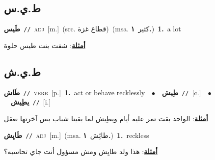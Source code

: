 \documentclass[10pt,a4paper,twoside]{article} %
\begin{document}
\begin{multicols}{2}
\vspace{-3mm}
\subsection*{\color{blue}\foreignlanguage{arabic}{ط.ي.س}\color{blue}{}} 

{\setlength\topsep{0pt}\textbf{\foreignlanguage{arabic}{طَيس}}\ {\color{gray}\texttt{//}\color{black}}\ \textsc{adj}\ [m.]\ (src. \color{gray}\foreignlanguage{arabic}{قطاع غزة}\color{black})\ \color{gray}(msa. \foreignlanguage{arabic}{كثير}~\foreignlanguage{arabic}{\textbf{١.}})\color{black}\ \textbf{1.}~a lot\  \begin{flushright}\color{gray}\foreignlanguage{arabic}{\textbf{\underline{\foreignlanguage{arabic}{أمثلة}}}: شفت بنت طيس حلوة}\end{flushright}\color{black}} \vspace{2mm}

\vspace{-3mm}
\subsection*{\color{blue}\foreignlanguage{arabic}{ط.ي.ش}\color{blue}{}} 

{\setlength\topsep{0pt}\textbf{\foreignlanguage{arabic}{طَاش}}\ {\color{gray}\texttt{//}\color{black}}\ \textsc{verb}\ [p.]\ \textbf{1.}~act or behave recklessly\ \ $\bullet$\ \ \setlength\topsep{0pt}\textbf{\foreignlanguage{arabic}{طِيش}}\ {\color{gray}\texttt{//}\color{black}}\ [c.]\ \ $\bullet$\ \ \setlength\topsep{0pt}\textbf{\foreignlanguage{arabic}{يطِيش}}\ {\color{gray}\texttt{//}\color{black}}\ [i.]\  \begin{flushright}\color{gray}\foreignlanguage{arabic}{\textbf{\underline{\foreignlanguage{arabic}{أمثلة}}}: الواحد بقت تمر عليه أيام ويطِيش لما بقينا شباب بس آخرتها نعقل}\end{flushright}\color{black}} \vspace{2mm}

{\setlength\topsep{0pt}\textbf{\foreignlanguage{arabic}{طَايِش}}\ {\color{gray}\texttt{//}\color{black}}\ \textsc{adj}\ [m.]\ \color{gray}(msa. \foreignlanguage{arabic}{طائِش}~\foreignlanguage{arabic}{\textbf{١.}})\color{black}\ \textbf{1.}~reckless\  \begin{flushright}\color{gray}\foreignlanguage{arabic}{\textbf{\underline{\foreignlanguage{arabic}{أمثلة}}}: هذا ولد طايِش ومش مسؤول أنت جاي تحاسبه؟}\end{flushright}\color{black}} \vspace{2mm}


\end{multicols}
\end{document}
